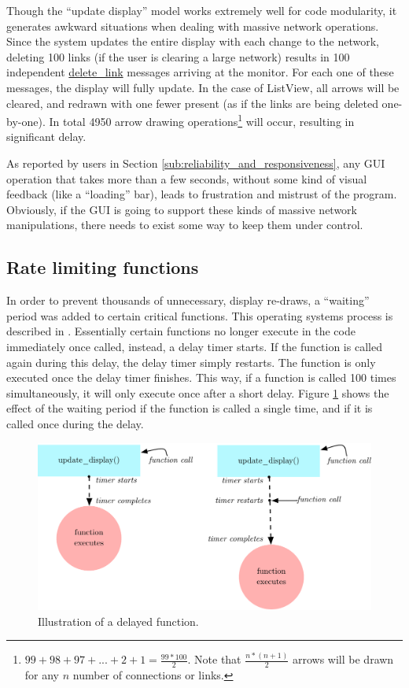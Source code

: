 Though the ``update display'' model works extremely well for code modularity, it generates awkward situations when dealing with massive network operations. Since the system updates the entire display with each change to the network, deleting 100 links (if the user is clearing a large network) results in 100 independent \url{delete_link} messages arriving at the monitor. For each one of these messages, the display will fully update. In the case of ListView, all arrows will be cleared, and redrawn with one fewer present (as if the links are being deleted one-by-one). In total 4950 arrow drawing operations\footnote{$99 + 98 + 97 + ... + 2 + 1 = \frac{99*100}{2}$. Note that $\frac{n*(n+1)}{2}$ arrows will be drawn for any $n$ number of connections or links.} will occur, resulting in significant delay. 

As reported by users in Section \ref{sub:reliability_and_responsiveness}, any GUI operation that takes more than a few seconds, without some kind of visual feedback (like a ``loading'' bar), leads to frustration and mistrust of the program. Obviously, if the GUI is going to support these kinds of massive network manipulations, there needs to exist some way to keep them under control.

	\subsection{Rate limiting functions} %
	\label{sub:rate_limiting_certain_functions}

In order to prevent thousands of unnecessary, display re-draws, a ``waiting'' period was added to certain critical functions. This operating systems process is described in . Essentially certain functions no longer execute in the code immediately once called, instead, a delay timer starts. If the function is called again during this delay, the delay timer simply restarts. The function is only executed once the delay timer finishes. This way, if a function is called 100 times simultaneously, it will only execute once after a short delay. Figure \ref{fig:waiting_period} shows the effect of the waiting period if the function is called a single time, and if it is called once during the delay.

\begin{figure}[ht]
	\centering
		\includegraphics[width=1\textwidth]{figures/waiting_period}
		\caption{Illustration of a delayed function.}
		\label{fig:waiting_period}
\end{figure}

